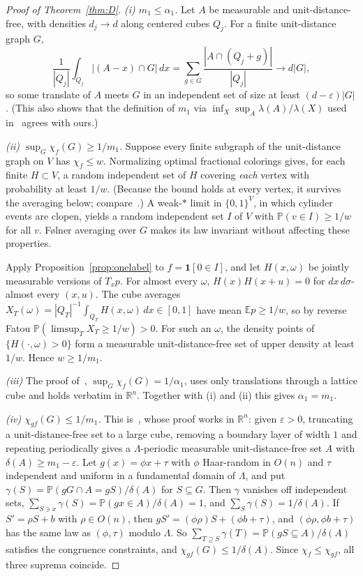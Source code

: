 \documentclass[11pt]{amsart}
\theoremstyle{definition}
\newcommand{\R}{\mathbb{R}}
\newcommand{\E}{\mathbb{E}}
\newcommand{\PP}{\mathbb{P}}
\begin{document}
\begin{proof}[Proof of Theorem~\ref{thm:D}]
\emph{(i) $m_1\le\alpha_1$.} Let $A$ be measurable and unit-distance-free, with densities $d_j\to d$ along centered cubes $Q_j$. For a finite unit-distance graph $G$,
\[
\frac1{|Q_j|}\int_{Q_j}|(A-x)\cap G|\,dx=\sum_{g\in G}\frac{|A\cap(Q_j+g)|}{|Q_j|}\to d|G| ,
\]
so some translate of $A$ meets $G$ in an independent set of size at least $(d-\varepsilon)|G|$. (This also shows that the definition of $m_1$ via $\inf_X\sup_A\lambda(A)/\lambda(X)$ used in~\cite{MRVZ} agrees with ours.)

\emph{(ii) $\sup_G\chi_f(G)\ge 1/m_1$.} Suppose every finite subgraph of the unit-distance graph on $V$ has $\chi_f\le w$. Normalizing optimal fractional colorings gives, for each finite $H\subset V$, a random independent set of $H$ covering \emph{each} vertex with probability at least $1/w$. (Because the bound holds at every vertex, it survives the averaging below; compare~\cite[Remark 5.4]{LS}.) A weak-$*$ limit in $\{0,1\}^V$, in which cylinder events are clopen, yields a random independent set $I$ of $V$ with $\PP(v\in I)\ge1/w$ for all $v$. F\o lner averaging over $G$ makes its law invariant without affecting these properties.

Apply Proposition~\ref{prop:onelabel} to $f=\mathbf 1[0\in I]$, and let $H(x,\omega)$ be jointly measurable versions of $T_xp$. For almost every $\omega$, $H(x)H(x+u)=0$ for $dx\,d\sigma$-almost every $(x,u)$. The cube averages $X_T(\omega)=|Q_T|^{-1}\int_{Q_T}H(x,\omega)\,dx\in[0,1]$ have mean $\E p\ge1/w$, so by reverse Fatou $\PP(\limsup_TX_T\ge1/w)>0$. For such an $\omega$, the density points of $\{H(\cdot,\omega)>0\}$ form a measurable unit-distance-free set of upper density at least $1/w$. Hence $w\ge1/m_1$.

\emph{(iii)} The proof of~\cite[Theorem 2]{MRVZ}, $\sup_G\chi_f(G)=1/\alpha_1$, uses only translations through a lattice cube and holds verbatim in $\R^n$. Together with (i) and (ii) this gives $\alpha_1=m_1$.

\emph{(iv) $\chi_{gf}(G)\le1/m_1$.} This is~\cite[Corollary 2]{ACMVZ}, whose proof works in $\R^n$: given $\varepsilon>0$, truncating a unit-distance-free set to a large cube, removing a boundary layer of width $1$ and repeating periodically gives a $\Lambda$-periodic measurable unit-distance-free set $A$ with $\delta(A)\ge m_1-\varepsilon$. Let $g(x)=\phi x+\tau$ with $\phi$ Haar-random in $O(n)$ and $\tau$ independent and uniform in a fundamental domain of $\Lambda$, and put $\gamma(S)=\PP(gG\cap A=gS)/\delta(A)$ for $S\subseteq G$. Then $\gamma$ vanishes off independent sets, $\sum_{S\ni x}\gamma(S)=\PP(gx\in A)/\delta(A)=1$, and $\sum_S\gamma(S)=1/\delta(A)$. If $S'=\rho S+b$ with $\rho\in O(n)$, then $gS'=(\phi\rho)S+(\phi b+\tau)$, and $(\phi\rho,\phi b+\tau)$ has the same law as $(\phi,\tau)$ modulo $\Lambda$. So $\sum_{T\supseteq S}\gamma(T)=\PP(gS\subseteq A)/\delta(A)$ satisfies the congruence constraints, and $\chi_{gf}(G)\le1/\delta(A)$. Since $\chi_f\le\chi_{gf}$, all three suprema coincide.


\end{proof}
\end{document}
